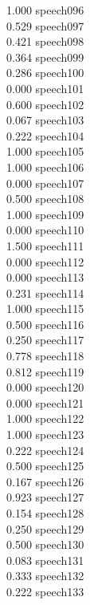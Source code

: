 \documentclass[10pt]{article}
\begin{document}
\begin{enumerate}
\begin{enumerate}
\begin{multicols}{5}
            1.000 speech096\\
            0.529 speech097\\
            0.421 speech098\\
            0.364 speech099\\
            0.286 speech100\\
            0.000 speech101\\
            0.600 speech102\\
            0.067 speech103\\
            0.222 speech104\\
            1.000 speech105\\
            1.000 speech106\\
            0.000 speech107\\
            0.500 speech108\\
            1.000 speech109\\
            0.000 speech110\\
            1.500 speech111\\
            0.000 speech112\\
            0.000 speech113\\
            0.231 speech114\\
            1.000 speech115\\
            0.500 speech116\\
            0.250 speech117\\
            0.778 speech118\\
            0.812 speech119\\
            0.000 speech120\\
            0.000 speech121\\
            1.000 speech122\\
            1.000 speech123\\
            0.222 speech124\\
            0.500 speech125\\
            0.167 speech126\\
            0.923 speech127\\
            0.154 speech128\\
            0.250 speech129\\
            0.500 speech130\\
            0.083 speech131\\
            0.333 speech132\\
            0.222 speech133\\

\end{multicols}
\end{enumerate}
\end{enumerate}
\end{document}
